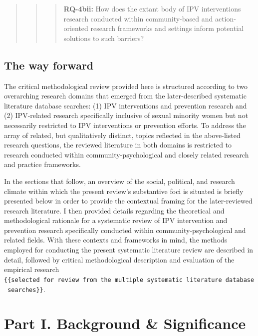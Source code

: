 \documentclass[11pt,]{tufte-book}
\newcommand{\rowgroup}[2][-1em]{\hspace{#1}#2}
\begin{document}
\begin{quote}
\begin{quote}
\begin{quote}
\rowgroup[-3em]{\textbf{RQ-4bii:} How does the extant body of IPV interventions research conducted within community-based and action-oriented research frameworks and settings inform potential solutions to such barriers?}
\end{quote}
\end{quote}
\end{quote}

\chapter{The way forward}\label{the-way-forward}

The critical methodological review provided here is structured according
to two overarching research domains that emerged from the
later-described systematic literature database searches: (1) IPV
interventions and prevention research and (2) IPV-related research
specifically inclusive of sexual minority women but not necessarily
restricted to IPV interventions or prevention efforts. To address the
array of related, but qualitatively distinct, topics reflected in the
above-listed research questions, the reviewed literature in both domains
is restricted to research conducted within community-psychological and
closely related research and practice frameworks.

In the sections that follow, an overview of the social, political, and
research climate within which the present review's substantive foci is
situated is briefly presented below in order to provide the contextual
framing for the later-reviewed research literature. I then provided
details regarding the theoretical and methodological rationale for a
systematic review of IPV intervention and prevention research
specifically conducted within community-psychological and related
fields. With these contexts and frameworks in mind, the methods employed
for conducting the present systematic literature review are described in
detail, followed by critical methodological description and evaluation
of the empirical research
\texttt{\{\{selected\ for\ review\ from\ the\ multiple\ systematic\ literature\ database\ searches\}\}}.

\part{Part I. Background \& Significance}
\end{document}
